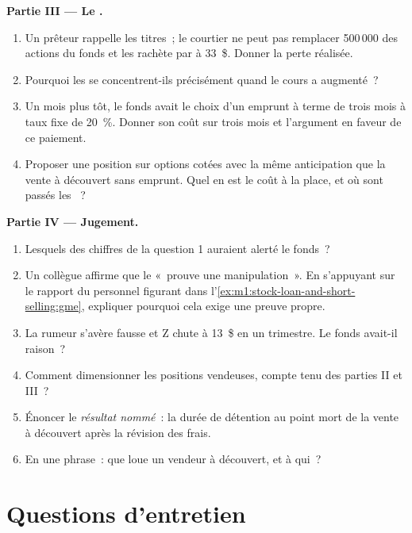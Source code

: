 \begin{problem}
\medskip\noindent\textbf{Partie III --- Le .}
\begin{enumerate}[resume]
\item Un prêteur rappelle les titres~; le courtier ne peut pas remplacer 500\,000 des
actions du fonds et les rachète par  à 33~\$. Donner la perte réalisée.
\item Pourquoi les  se concentrent-ils précisément quand le cours a augmenté~?
\item Un mois plus tôt, le fonds avait le choix d'un emprunt à terme de trois mois
à taux fixe de 20~\%. Donner son coût sur trois mois et l'argument en faveur de
ce paiement.
\item Proposer une position sur options cotées avec la même anticipation que la vente à découvert
sans emprunt. Quel en est le coût à la place, et où sont passés les ~?
\end{enumerate}

\medskip\noindent\textbf{Partie IV --- Jugement.}
\begin{enumerate}[resume]
\item Lesquels des chiffres de la question 1 auraient alerté le fonds~?
\item Un collègue affirme que le  «~prouve une manipulation~». En s'appuyant sur le
rapport du personnel figurant dans l'\cref{ex:m1:stock-loan-and-short-selling:gme}, expliquer pourquoi cela
exige une preuve propre.
\item La rumeur s'avère fausse et Z chute à 13~\$ en un trimestre. Le
fonds avait-il raison~?
\item Comment dimensionner les positions vendeuses, compte tenu des parties II et III~?
\item Énoncer le \emph{résultat nommé}~: la durée de détention au point mort de la
vente à découvert après la révision des frais.
\item En une phrase~: que loue un vendeur à découvert, et à qui~?
\end{enumerate}
\end{problem}

\section{Questions d'entretien}

